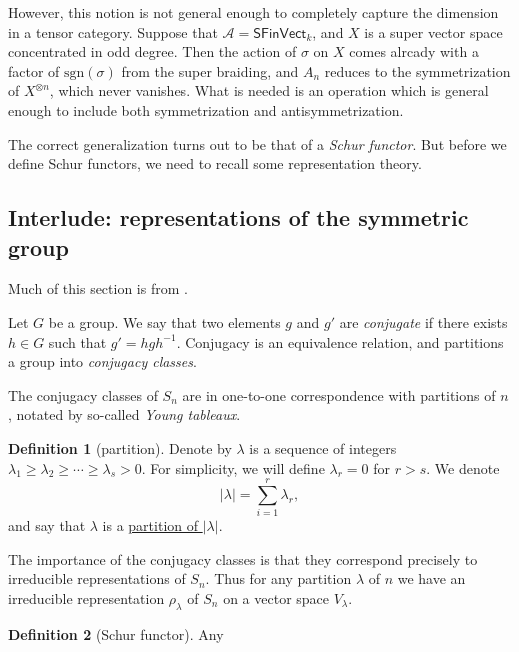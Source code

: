 \documentclass[a4paper,10pt]{scrreprt}
\newcommand{\defn}[1]{\ul{#1}}
\theoremstyle{definition}
\newtheorem{definition}{Definition}[section]
\theoremstyle{plain}
\theoremstyle{remark}
\begin{document}
However, this notion is not general enough to completely capture the dimension in a tensor category. Suppose that $\mathscr{A} = \mathsf{SFinVect}_{k}$, and $X$ is a super vector space concentrated in odd degree. Then the action of $\sigma$ on $X$ comes alrcady with a factor of $\mathrm{sgn}(\sigma)$ from the super braiding, and $A_{n}$ reduces to the symmetrization of $X^{\otimes n}$, which never vanishes. What is needed is an operation which is general enough to include both symmetrization and antisymmetrization.

The correct generalization turns out to be that of a \emph{Schur functor}. But before we define Schur functors, we need to recall some representation theory.

\subsection{Interlude: representations of the symmetric group}
Much of this section is from \cite{jpmds-representation-theory-symmetric-groups}.

Let $G$ be a group. We say that two elements $g$ and $g'$ are \emph{conjugate} if there exists $h \in G$ such that $g' = hgh^{-1}$. Conjugacy is an equivalence relation, and partitions a group into \emph{conjugacy classes}.

The conjugacy classes of $S_{n}$ are in one-to-one correspondence with partitions of $n$, notated by so-called \emph{Young tableaux}. 

\begin{definition}[partition]
  \label{def:partition}
  Denote by $\lambda$ is a sequence of integers $\lambda_{1} \geq \lambda_{2} \geq \cdots \geq \lambda_{s} > 0$. For simplicity, we will define $\lambda_{r} = 0$ for $r > s$. We denote
  \begin{equation*}
    \left|\lambda\right| = \sum_{i = 1}^{r} \lambda_{r},
  \end{equation*}
  and say that $\lambda$ is a \defn{partition of $\left|\lambda\right|$}.
\end{definition}

The importance of the conjugacy classes is that they correspond precisely to irreducible representations of $S_{n}$. Thus for any partition $\lambda$ of $n$ we have an irreducible representation $\rho_{\lambda}$ of $S_{n}$ on a vector space $V_{\lambda}$.

\begin{definition}[Schur functor]
  \label{def:schurfunctor}
  Any
\end{definition}
\end{document}
